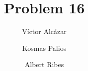 

\title{Problem 16}
\author{
Víctor Alcázar
\and
Kosmas Palios
\and
Albert Ribes
}

\maketitle




